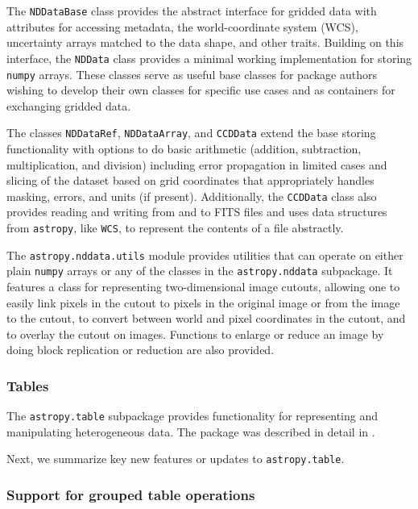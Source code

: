 \documentclass[modern]{aastex61}
\newcommand{\package}[1]{\texttt{#1}\xspace}
\newcommand{\astropypkg}{\package{astropy}}
\newcommand{\inlinecomment}[2]{\todo[inline]{#1: #2}\xspace}
\begin{document}
The \texttt{NDDataBase} class provides the abstract interface for gridded data
with attributes for accessing metadata, the world-coordinate system (WCS),
uncertainty arrays matched to the data shape, and other traits.
Building on this interface, the \texttt{NDData} class provides a minimal working implementation for storing \package{numpy} arrays. These classes serve as useful base classes for package authors wishing to develop their own classes for specific use cases and as containers for exchanging gridded data.

The classes \texttt{NDDataRef}, \texttt{NDDataArray}, and \texttt{CCDData} extend the base storing functionality with options to do basic arithmetic (addition, subtraction, multiplication, and division) including error propagation in limited cases and slicing of the dataset based on grid coordinates that appropriately handles masking, errors, and units (if present). Additionally, the \texttt{CCDData} class also provides reading and writing from and to FITS files and uses data structures from \astropypkg, like \texttt{WCS}, to represent the contents of a file abstractly.

The \package{astropy.nddata.utils} module provides utilities that can operate on either plain \package{numpy} arrays or any of the classes in the \package{astropy.nddata} subpackage. It features a class for representing two-dimensional image cutouts, allowing one to easily link pixels in the cutout to pixels in the original image or from the image to the cutout, to convert between world and pixel coordinates in the cutout, and to overlay the cutout on images. Functions to enlarge or reduce an image by doing block replication or reduction are also provided.

\subsubsection{Tables}
\label{sec:table}

The \package{astropy.table} subpackage provides functionality for representing
and manipulating heterogeneous data.
The package was described in detail in \cite{astropy}.

Next, we summarize key new features or updates to \package{astropy.table}.


\subsubsection{Support for grouped table operations}
\end{document}
